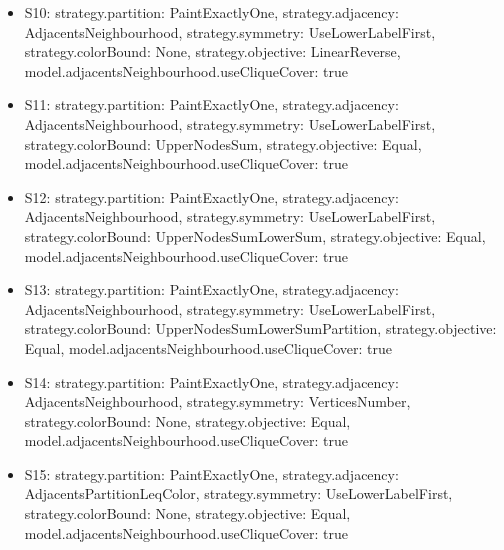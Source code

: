 \documentclass[landscape, 12pt]{report}
\begin{document}
\begin{itemize}
\item S10: strategy.partition: PaintExactlyOne, strategy.adjacency: AdjacentsNeighbourhood, strategy.symmetry: UseLowerLabelFirst, strategy.colorBound: None, strategy.objective: LinearReverse, model.adjacentsNeighbourhood.useCliqueCover: true
\item S11: strategy.partition: PaintExactlyOne, strategy.adjacency: AdjacentsNeighbourhood, strategy.symmetry: UseLowerLabelFirst, strategy.colorBound: UpperNodesSum, strategy.objective: Equal, model.adjacentsNeighbourhood.useCliqueCover: true
\item S12: strategy.partition: PaintExactlyOne, strategy.adjacency: AdjacentsNeighbourhood, strategy.symmetry: UseLowerLabelFirst, strategy.colorBound: UpperNodesSumLowerSum, strategy.objective: Equal, model.adjacentsNeighbourhood.useCliqueCover: true
\item S13: strategy.partition: PaintExactlyOne, strategy.adjacency: AdjacentsNeighbourhood, strategy.symmetry: UseLowerLabelFirst, strategy.colorBound: UpperNodesSumLowerSumPartition, strategy.objective: Equal, model.adjacentsNeighbourhood.useCliqueCover: true
\item S14: strategy.partition: PaintExactlyOne, strategy.adjacency: AdjacentsNeighbourhood, strategy.symmetry: VerticesNumber, strategy.colorBound: None, strategy.objective: Equal, model.adjacentsNeighbourhood.useCliqueCover: true
\item S15: strategy.partition: PaintExactlyOne, strategy.adjacency: AdjacentsPartitionLeqColor, strategy.symmetry: UseLowerLabelFirst, strategy.colorBound: None, strategy.objective: Equal, model.adjacentsNeighbourhood.useCliqueCover: true
\end{itemize}
\end{document}
